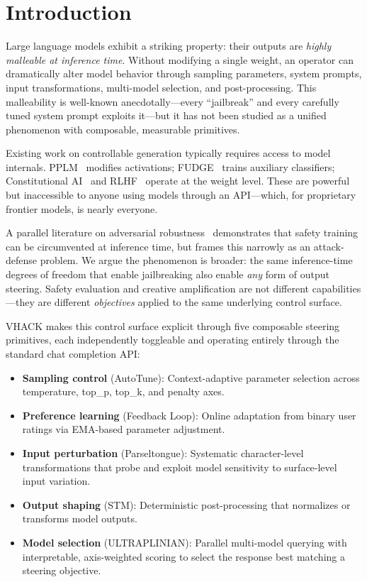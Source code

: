 \documentclass[11pt]{article}
\begin{document}
\section{Introduction}

Large language models exhibit a striking property: their outputs are \emph{highly malleable at inference time}. Without modifying a single weight, an operator can dramatically alter model behavior through sampling parameters, system prompts, input transformations, multi-model selection, and post-processing. This malleability is well-known anecdotally---every ``jailbreak'' and every carefully tuned system prompt exploits it---but it has not been studied as a unified phenomenon with composable, measurable primitives.

Existing work on controllable generation typically requires access to model internals. PPLM~\cite{dathathri2020plug} modifies activations; FUDGE~\cite{yang2021fudge} trains auxiliary classifiers; Constitutional AI~\cite{bai2022constitutional} and RLHF~\cite{ouyang2022training} operate at the weight level. These are powerful but inaccessible to anyone using models through an API---which, for proprietary frontier models, is nearly everyone.

A parallel literature on adversarial robustness~\cite{zou2023universal,wei2023jailbroken,chao2023jailbreaking} demonstrates that safety training can be circumvented at inference time, but frames this narrowly as an attack-defense problem. We argue the phenomenon is broader: the same inference-time degrees of freedom that enable jailbreaking also enable \emph{any} form of output steering. Safety evaluation and creative amplification are not different capabilities---they are different \emph{objectives} applied to the same underlying control surface.

\textsc{VHACK} makes this control surface explicit through five composable steering primitives, each independently toggleable and operating entirely through the standard chat completion API:

\begin{itemize}
    \item \textbf{Sampling control} (AutoTune): Context-adaptive parameter selection across temperature, top\_p, top\_k, and penalty axes.
    \item \textbf{Preference learning} (Feedback Loop): Online adaptation from binary user ratings via EMA-based parameter adjustment.
    \item \textbf{Input perturbation} (Parseltongue): Systematic character-level transformations that probe and exploit model sensitivity to surface-level input variation.
    \item \textbf{Output shaping} (STM): Deterministic post-processing that normalizes or transforms model outputs.
    \item \textbf{Model selection} (ULTRAPLINIAN): Parallel multi-model querying with interpretable, axis-weighted scoring to select the response best matching a steering objective.
\end{itemize}
\end{document}
